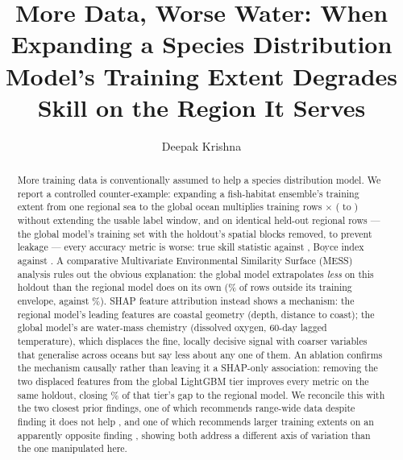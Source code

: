 \documentclass[runningheads]{llncs}
\providecommand{\citep}[1]{\cite{#1}}
\begin{document}
\title{More Data, Worse Water: When Expanding a Species Distribution Model's
Training Extent Degrades Skill on the Region It Serves}


\author{Deepak Krishna}

\maketitle

\begin{abstract}
More training data is conventionally assumed to help a species distribution
model. We report a controlled counter-example: expanding a fish-habitat
ensemble's training extent from one regional sea to the global ocean
multiplies training rows \DataMultiple{}$\times$ (\NRegionalTrain{} to
\NGlobalTrain{}) without extending the usable label window, and on
\NHoldout{} identical held-out regional rows --- the global model's training
set with the holdout's spatial blocks removed, to prevent leakage --- every
accuracy metric is worse: true skill statistic \TSSGlobal{} against
\TSSRegion{}, Boyce index \BoyceGlobal{} against \BoyceRegion{}. A comparative
Multivariate Environmental Similarity Surface (MESS) analysis rules out the
obvious explanation: the global model extrapolates \emph{less} on this
holdout than the regional model does on its own (\MESSFracGlobal{}\% of rows
outside its training envelope, against \MESSFracRegion{}\%). SHAP feature
attribution instead shows a mechanism: the regional model's leading features
are coastal geometry (depth, distance to coast); the global model's are
water-mass chemistry (dissolved oxygen, 60-day lagged temperature), which
displaces the fine, locally decisive signal with coarser variables that
generalise across oceans but say less about any one of them. An ablation confirms the mechanism causally rather than leaving it a SHAP-only association: removing the two displaced features from the global LightGBM tier improves every metric on the same holdout, closing \AblGapClosedPct{}\% of that tier's gap to the regional model. We reconcile
this with the two closest prior findings, one of which recommends
range-wide data despite finding it does not help \citep{elgabbas2018}, and
one of which recommends larger training extents on an apparently opposite
finding \citep{hanberry2026}, showing both address a different axis of
variation than the one manipulated here.
\end{abstract}
\end{document}
